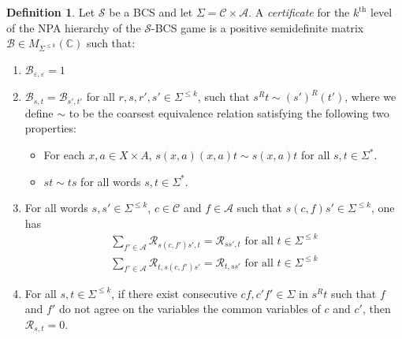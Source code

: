 \documentclass[11pt,a4paper]{article}
\theoremstyle{plain}
\theoremstyle{remark}
\theoremstyle{definition}
\newtheorem{definition}[thm]{Definition}
\def\calA{{\mathcal A}} \def\calB{{\mathcal B}} \def\calC{{\mathcal C}}
\def\calS{{\mathcal S}} \def\calT{{\mathcal T}} \def\calU{{\mathcal U}}
\renewcommand\epsilon\varepsilon
\begin{document}
\begin{definition}\label{def:cert-npa-bcs}
    Let $\calS$ be a BCS and let $\Sigma = \calC \times \calA$.
    A \emph{certificate} for the $k^{\text{th}}$ level of the NPA hierarchy of the $\calS$-BCS game is a positive semidefinite matrix $\calB \in M_{\Sigma^{\leq k}}(\mathbb{C})$ such that: 
    \begin{enumerate}[label = (\roman*)]\label{eq:npa-for-graph-iso}
        \item \label{bcs-item-1}$\mathcal{B}_{\epsilon, \epsilon} = 1$
        \item \label{bcs-item-2} $\calB_{s,t} = \calB_{s',t'}$ for all $r,s,r',s' \in \Sigma^{\leq k}$, such that $s^Rt \sim (s')^R(t')$, where  we define $\sim$ to be the coarsest equivalence relation satisfying the following two properties:
\begin{itemize}
    \item For each $x,a \in X \times A$, $s(x,a)(x,a)t \sim s(x,a)t$ for all $s,t \in \Sigma^*$.
    \item $st \sim ts$ for all words $s,t \in \Sigma^*$.
\end{itemize} \item \label{bcs-item-3} For all words $s,s' \in \Sigma^{\leq k}$, $c\in \calC$ and $f \in \calA$ such that $s(c,f)s' \in \Sigma^{\leq k}$, one has 
        \begin{align}
            \sum_{f' \in \calA} \mathcal{R}_{s(c,f')s', t} = \mathcal{R}_{ss', t} \text{ for all } t\in \Sigma^{\leq k}\label{eq:bcs31}\\
\sum_{f' \in \calA} \mathcal{R}_{t, s(c,f')s'} = \mathcal{R}_{t, ss'} \text{ for all } t\in \Sigma^{\leq k}
\end{align}
\item \label{bcs-item-4} For all $s, t \in\Sigma^{\leq k}$, if there exist consecutive $cf, c'f' \in \Sigma$ in $s^Rt$ such that $f$ and $f'$ do not agree on the variables the common variables of $c$ and $c'$, then $\mathcal{R}_{s, t} = 0$. 
\end{enumerate}
\end{definition}
\end{document}
